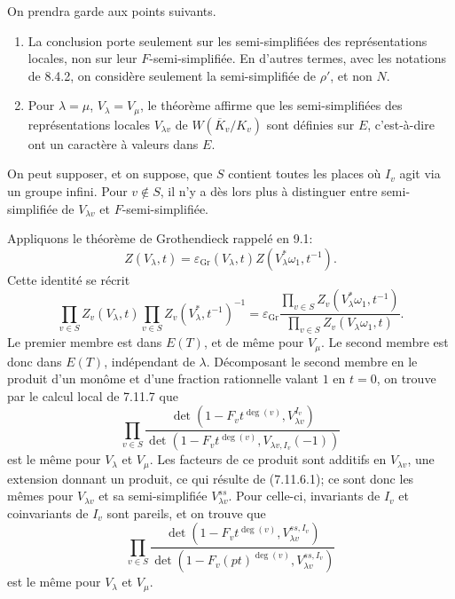 \documentclass[10pt]{article}
\begin{document}
On prendra garde aux points suivants.
\begin{enumerate}[label=(\alph*)]
\item La conclusion porte seulement sur les semi-simplifiées des représentations locales, non sur leur $F$-semi-simplifiée. En d'autres termes, avec les notations de 8.4.2, on considère seulement la semi-simplifiée de $\rho'$, et non $N$.
\item Pour $\lambda=\mu$, $V_\lambda=V_\mu$, le théorème affirme que les semi-simplifiées des représentations locales $V_{\lambda v}$ de $W(\overline K_v/K_v)$ sont définies sur $E$, c'est-à-dire ont un caractère à valeurs dans $E$.
\end{enumerate}
On peut supposer, et on suppose, que $S$ contient toutes les places où $I_v$ agit via un groupe infini. Pour $v\notin S$, il n'y a dès lors plus à distinguer entre semi-simplifiée de $V_{\lambda v}$ et $F$-semi-simplifiée.

Appliquons le théorème de Grothendieck rappelé en 9.1:
\[
Z(V_\lambda,t)=\varepsilon_{\mathrm{Gr}}(V_\lambda,t)Z(V_\lambda^*\omega_1,t^{-1}).
\]
Cette identité se récrit
\[
\prod_{v\in S}Z_v(V_\lambda,t)\prod_{v\in S}Z_v(V_\lambda^*,t^{-1})^{-1}
=
\varepsilon_{\mathrm{Gr}}
\frac{\prod_{v\in S}Z_v(V_\lambda^*\omega_1,t^{-1})}
{\prod_{v\in S}Z_v(V_\lambda\omega_1,t)}.
\]
Le premier membre est dans $E(T)$, et de même pour $V_\mu$. Le second membre est donc dans $E(T)$, indépendant de $\lambda$. Décomposant le second membre en le produit d'un monôme et d'une fraction rationnelle valant $1$ en $t=0$, on trouve par le calcul local de 7.11.7 que
\[
\prod_{v\in S}
\frac{\det(1-F_vt^{\deg(v)},V_{\lambda v}^{I_v})}
{\det(1-F_vt^{\deg(v)},V_{\lambda v,I_v}(-1))}
\]
est le même pour $V_\lambda$ et $V_\mu$. Les facteurs de ce produit sont additifs en $V_{\lambda v}$, une extension donnant un produit, ce qui résulte de (7.11.6.1); ce sont donc les mêmes pour $V_{\lambda v}$ et sa semi-simplifiée $V_{\lambda v}^{ss}$. Pour celle-ci, invariants de $I_v$ et coinvariants de $I_v$ sont pareils, et on trouve que
\[
\tag{9.8.1}
\prod_{v\in S}
\frac{\det(1-F_vt^{\deg(v)},V_{\lambda v}^{ss,I_v})}
{\det(1-F_v(pt)^{\deg(v)},V_{\lambda v}^{ss,I_v})}
\]
est le même pour $V_\lambda$ et $V_\mu$.
\end{document}
